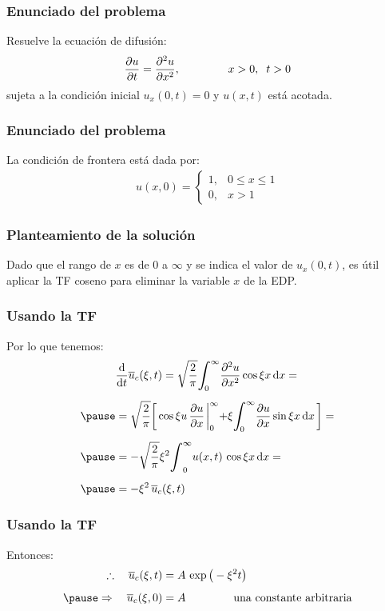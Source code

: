 \documentclass[12pt]{beamer}
\begin{document}
\begin{frame}
\frametitle{Enunciado del problema}
Resuelve la ecuación de difusión:
\pause
\begin{align*}
\pdv{u}{t} = \pdv[2]{u}{x}, \hspace{1.5cm} x > 0, \hspace{0.2cm} t > 0
\end{align*}
sujeta a la condición inicial $u_{x} (0, t) = 0$ y $u (x, t)$ está acotada.
\end{frame}
\begin{frame}
\frametitle{Enunciado del problema}
La condición de frontera está dada por:
\pause
\begin{align*}
u(x, 0) = \begin{cases}
1, & 0 \leq x \leq 1 \\
0, & x > 1
\end{cases}
\end{align*}
\end{frame}
\begin{frame}
\frametitle{Planteamiento de la solución}
Dado que el rango de $x$ es de $0$ a $\infty$ y se indica el valor de $u_{x} (0, t)$, \pause es útil aplicar la TF coseno para eliminar la variable $x$ de la EDP.
\end{frame}
\begin{frame}
\frametitle{Usando la TF}
Por lo que tenemos:
\pause
\begin{eqnarray*}
\begin{aligned}
&\dv{t} \overline{u}_{c} (\xi, t) = \sqrt{\dfrac{2}{\pi}} \scaleint{6ex}_{\bs 0}^{\infty} \displaystyle \pdv[2]{u}{x} \cos \xi x \dd{x} = \\[0.5em] \pause
&= \sqrt{\dfrac{2}{\pi}} \bigg[ \cos \xi u \, \pdv{u}{x} \eval_{0}^{\infty} {+} \xi \scaleint{6ex}_{\bs 0}^{\infty} \pdv{u}{x} \sin \xi x \dd{x} \bigg] = \\[0.5em] \pause
&= - \sqrt{\dfrac{2}{\pi}} \xi^{2} \scaleint{6ex}_{0}^{\infty} u (x, t) \, \cos \xi x \dd{x} = \\[0.5em] \pause 
&= - \xi^{2} \, \overline{u}_{c} (\xi, t)
\end{aligned}
\end{eqnarray*}
\end{frame}
\begin{frame}
\frametitle{Usando la TF}
Entonces:
\pause
\begin{eqnarray*}
\begin{aligned}
\therefore \quad \overline{u}_{c} (\xi, t) &= A \, \exp\big( - \xi^{2} t \big) \\[0.5em] \pause
\Rightarrow \quad \overline{u}_{c} (\xi, 0) &= A \hspace{1.5cm} \mbox{una constante arbitraria}
\end{aligned}
\end{eqnarray*}
\end{frame}
\end{document}
